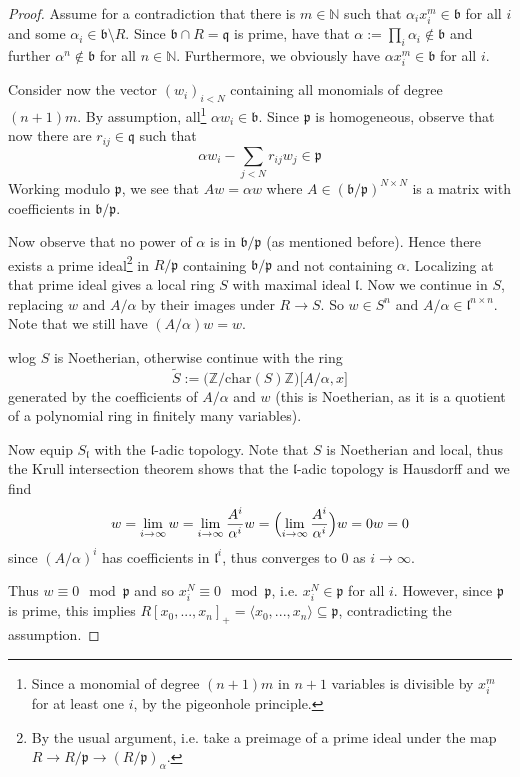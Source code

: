 \documentclass{scrartcl}
\newcommand{\N}{\mathbb{N}}
\newcommand{\Z}{\mathbb{Z}}
\newcommand{\p}{\mathfrak{p}}
\newcommand{\q}{\mathfrak{q}}
\renewcommand{\b}{\mathfrak{b}}
\theoremstyle{definition}
\begin{document}
\begin{proof}
    Assume for a contradiction  that there is $m \in \N$ such that $\alpha_i x_i^m \in \b$ for all $i$ and some $\alpha_i \in \b \setminus R$.
    Since $\b \cap R = \q$ is prime, have that $\alpha := \prod_i \alpha_i \notin \b$ and further $\alpha^n \notin \b$ for all $n \in \N$.
    Furthermore, we obviously have $\alpha x_i^m \in \b$ for all $i$.

    Consider now the vector $(w_i)_{i < N}$ containing all monomials of degree $(n + 1)m$.
    By assumption, all\footnote{Since a monomial of degree $(n + 1)m$ in $n + 1$ variables is divisible by $x_i^m$ for at least one $i$, by the pigeonhole principle.} $\alpha w_i \in \b$.
    Since $\p$ is homogeneous, observe that now there are $r_{ij} \in \q$ such that
    \begin{equation*}
        \alpha w_i - \sum_{j < N} r_{ij} w_j \in \p
    \end{equation*}
    Working modulo $\p$, we see that $A w = \alpha w$ where $A \in (\b/\p)^{N \times N}$ is a matrix with coefficients in $\b/\p$.

    Now observe that no power of $\alpha$ is in $\b/\p$ (as mentioned before).
    Hence there exists a prime ideal\footnote{By the usual argument, i.e. take a preimage of a prime ideal under the map $R \to R/\p \to (R/\p)_\alpha$.} in $R/\p$ containing $\b/\p$ and not containing $\alpha$.
    Localizing at that prime ideal gives a local ring $S$ with maximal ideal $\mathfrak{l}$.
    Now we continue in $S$, replacing $w$ and $A/\alpha$ by their images under $R \to S$.
    So $w \in S^n$ and $A/\alpha \in \mathfrak{l}^{n \times n}$.
    Note that we still have $(A/\alpha) w = w$.

    wlog $S$ is Noetherian, otherwise continue with the ring
    \begin{equation*}
        \tilde{S} := \bigl( \Z / \mathrm{char}(S) \Z \bigr) \bigl[ A/\alpha, x \bigr]
    \end{equation*}
    generated by the coefficients of $A/\alpha$ and $w$ (this is Noetherian, as it is a quotient of a polynomial ring in finitely many variables).
    
    Now equip $S_{\mathfrak{l}}$ with the $\mathfrak{l}$-adic topology.
    Note that $S$ is Noetherian and local, thus the Krull intersection theorem \cite[8.41]{comalg_notes} shows that the $\mathfrak{l}$-adic topology is Hausdorff and we find
    \begin{equation*}
        w = \lim_{i \to \infty} w = \lim_{i \to \infty} \frac {A^i} {\alpha^i} w = \Bigl( \lim_{i \to \infty} \frac {A^i} {\alpha^i} \Bigr) w = 0 w = 0
    \end{equation*}
    since $(A/\alpha)^i$ has coefficients in $\mathfrak{l}^i$, thus converges to $0$ as $i \to \infty$.

    Thus $w \equiv 0 \mod \p$ and so $x_i^N \equiv 0 \mod \p$, i.e. $x_i^N \in \p$ for all $i$.
    However, since $\p$ is prime, this implies $R[x_0, ..., x_n]_+ = \langle x_0, ..., x_n \rangle \subseteq \p$, contradicting the assumption. 
\end{proof}
\end{document}
